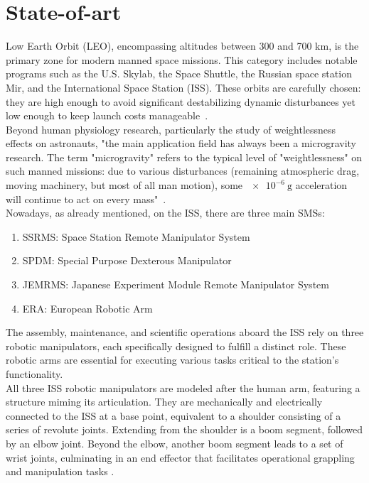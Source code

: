 \documentclass[a4paper,12pt,oneside]{report}
\begin{document}
\section{State-of-art}\label{state_of_art}
Low Earth Orbit (LEO), encompassing altitudes between 300 and 700 km, is the primary zone for modern manned space missions. This category includes notable programs such as the U.S. Skylab, the Space Shuttle, the Russian space station Mir, and the International Space Station (ISS). These orbits are carefully chosen: they are high enough to avoid significant destabilizing dynamic disturbances yet low enough to keep launch costs manageable~\cite{one}.\\
Beyond human physiology research, particularly the study of weightlessness effects on astronauts, "the main application field has always been a microgravity research. The term "microgravity" refers to the typical level of "weightlessness" on such manned missions: due to various disturbances (remaining atmospheric drag, moving machinery, but most of all man motion), some $\SI{e-6}{\gram}$ acceleration will continue to act on every mass"~\cite{one}.\\
Nowadays, as already mentioned, on the ISS, there are three main SMSs:
\begin{enumerate}
  \item SSRMS: Space Station Remote Manipulator System
  \item SPDM: Special Purpose Dexterous Manipulator
  \item JEMRMS: Japanese Experiment Module Remote Manipulator System
  \item ERA: European Robotic Arm
\end{enumerate}
The assembly, maintenance, and scientific operations aboard the ISS rely on three robotic manipulators, each specifically designed to fulfill a distinct role. These robotic arms are essential for executing various tasks critical to the station’s functionality.\\
All three ISS robotic manipulators are modeled after the human arm, featuring a structure miming its articulation. They are mechanically and electrically connected to the ISS at a base point, equivalent to a shoulder consisting of a series of revolute joints. Extending from the shoulder is a boom segment, followed by an elbow joint. Beyond the elbow, another boom segment leads to a set of wrist joints, culminating in an end effector that facilitates operational grappling and manipulation tasks \cite{four}.
\newpage
\end{document}
